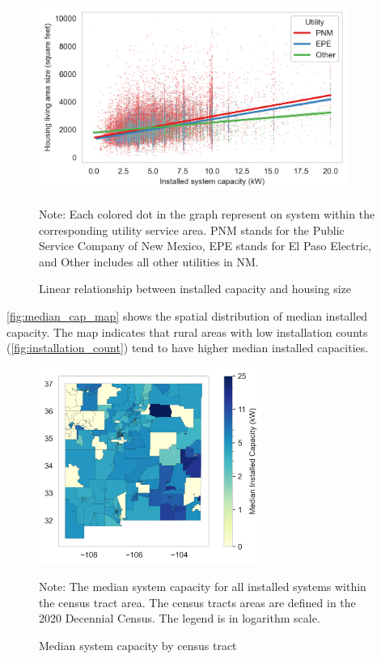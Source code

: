\documentclass[11pt,twoside,letterpaper]{article}
\begin{document}
\begin{figure}[!ht]
    \centering
\includegraphics[width=0.9\textwidth]{figures/capacity_house_size.png}
    \caption{Linear relationship between installed capacity and housing size}
    \label{fig:capacity_size}
        \begin{flushleft}
        \footnotesize Note: Each colored dot in the graph represent on system within the corresponding utility service area. PNM stands for the Public Service Company of New Mexico, EPE stands for El Paso Electric, and Other includes all other utilities in NM.
    \end{flushleft}
\end{figure}

\autoref{fig:median_cap_map} shows the spatial distribution of median installed capacity. The map indicates that rural areas with low installation counts (\autoref{fig:installation_count}) tend to have higher median installed capacities.


\begin{figure}[!ht]
    \centering
\includegraphics[width=0.65\textwidth]{figures/tract_median_capacity_map.png}
    \caption{Median system capacity by census tract}
    \label{fig:median_cap_map}
        \begin{flushleft}
        \footnotesize Note: The median system capacity for all installed systems within the census tract area. The census tracts areas are defined in the 2020 Decennial Census. The legend is in logarithm scale. 
    \end{flushleft}
\end{figure}
\end{document}
